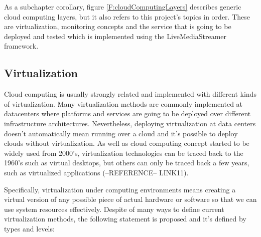 As a subchapter corollary, figure \ref{F:cloudComputingLayers} describes generic cloud computing layers, but it also refers to this project's topics in order. These are virtualization, monitoring concepts and the service that is going to be deployed and tested which is implemented using the LiveMediaStreamer framework.

\subsection{Virtualization}\label{SOA:Virtualization}

Cloud computing is usually strongly related and implemented with different kinds of virtualization. Many virtualization methods are commonly implemented at datacenters where platforms and services are going to be deployed over different infrastructure architectures. Nevertheless, deploying virtualization at data centers doesn’t automatically mean running over a cloud and it’s possible to deploy clouds without virtualization. As well as cloud computing concept started to be widely used from 2000's, virtualization  technologies can be traced back to the 1960’s such as virtual desktops, but others can only be traced back a few years, such as virtualized applications (--REFERENCE-- LINK11).

Specifically, virtualization under computing environments means creating a virtual version of any possible piece of actual hardware or software so that we can use system resources effectively. Despite of many ways to define current virtualization methods, the following statement is proposed and it's defined by types and levels:

